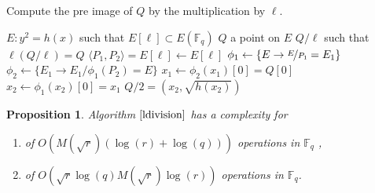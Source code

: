 \documentclass{article}
\theoremstyle{plain}
\newtheorem{prop}[thm]{Proposition}
\theoremstyle{definition}
\theoremstyle{remark}
\begin{document}
\begin{algorithm}
\caption{\label{ldivision}Compute the pre image of $Q$ by the multiplication by $\ell$.}
\begin{algorithmic}[5]
\REQUIRE  $E: y^2=h(x)$ such that $E[\ell] \subset E(\mathbb{F}_q)$ %
\STATE $Q$ a point on $E$
\ENSURE $Q/\ell$ such that $\ell(Q/\ell)=Q$
\STATE $ \langle P_1,P_2 \rangle = E[\ell] \gets E[\ell] $
\STATE $\phi_1  \gets \lbrace E\rightarrow \nicefrac{E}{P_1}=E_1 \rbrace $
\STATE $\phi_2  \gets \lbrace E_1\rightarrow {E_1}/{\phi_1(P_2)}=E \rbrace $
\STATE $x_1 \gets \phi_2(x_1)[0]=Q[0] $
\STATE $x_2 \gets \phi_1(x_2)[0]=x_1  $
\RETURN $Q/2=(x_2,\sqrt{h(x_2)})$
\end{algorithmic}
\end{algorithm}

\begin{prop}
Algorithm $\ref{ldivision}$ has a complexity for
\begin{enumerate}
\item[$\ell = 2$] of $O(M(\sqrt{r})(\log(r)+\log(q)))$ operations in $\mathbb{F}_q$ ,
\item[$\ell \neq 2$]of $O(\sqrt{r} \log(q) M(\sqrt{r})\log(r))$ operations in $\mathbb{F}_q$.
\end{enumerate}
 
\end{prop}
\end{document}
